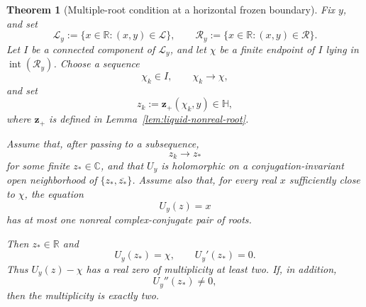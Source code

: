 \documentclass[10pt,a4paper]{amsart}
\newtheorem{theorem}{Theorem}
\begin{document}
\begin{theorem}[Multiple-root condition at a horizontal frozen boundary]
\label{t17}
Fix \(y\), and set
\[
    \mathcal L_y
    :=
    \{x\in\mathbb R:(x,y)\in\mathcal L\},
    \qquad
    \mathcal R_y
    :=
    \{x\in\mathbb R:(x,y)\in\mathcal R\}.
\]
Let \(I\) be a connected component of \(\mathcal L_y\), and let
\(\chi\) be a finite endpoint of \(I\) lying in
\(\operatorname{int}(\mathcal R_y)\). Choose a sequence
\[
    \chi_k\in I,
    \qquad
    \chi_k\longrightarrow\chi,
\]
and set
\[
    z_k:=\mathbf z_+(\chi_k,y)\in\mathbb H,
\]
where \(\mathbf z_+\) is defined in
Lemma~\ref{lem:liquid-nonreal-root}.

Assume that, after passing to a subsequence,
\[
    z_k\longrightarrow z_*
\]
for some finite \(z_*\in\mathbb C\), and that \(U_y\) is holomorphic on
a conjugation-invariant open neighborhood of
\(\{z_*,\overline{z_*}\}\). Assume also that, for every real \(x\)
sufficiently close to \(\chi\), the equation
\[
    U_y(z)=x
\]
has at most one nonreal complex-conjugate pair of roots.

Then \(z_*\in\mathbb R\) and
\[
    U_y(z_*)=\chi,
    \qquad
    U_y'(z_*)=0.
\]
Thus \(U_y(z)-\chi\) has a real zero of multiplicity at least two. If,
in addition,
\[
    U_y''(z_*)\neq0,
\]
then the multiplicity is exactly two.
\end{theorem}
\end{document}
